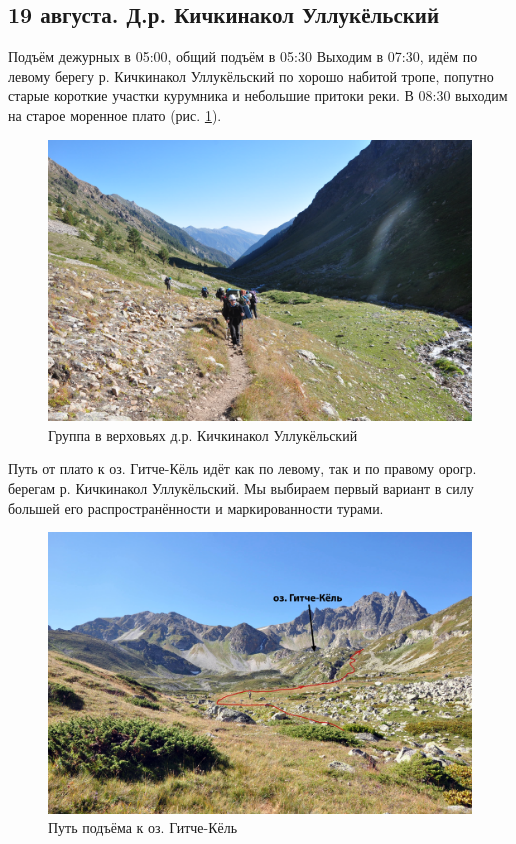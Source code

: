 \subsection{19 августа. Д.р. Кичкинакол Уллукёльский}

Подъём дежурных в 05:00, общий подъём в 05:30 
Выходим в 07:30, идём по левому берегу р. Кичкинакол Уллукёльский по хорошо набитой тропе, попутно  старые короткие участки курумника и небольшие притоки реки. В 08:30 выходим на старое моренное плато (рис. \ref{fig:DSC_0692}).

\begin{figure}[h!]
	\centering
	\includegraphics[width=0.7\linewidth]{../pics/DSC_0692}
	\caption{Группа в верховьях д.р. Кичкинакол Уллукёльский}
	\label{fig:DSC_0692}
\end{figure}

Путь от плато к оз. Гитче-Кёль идёт как по левому, так и по правому орогр. берегам р. Кичкинакол Уллукёльский. Мы выбираем первый вариант в силу большей его распространённости и маркированности турами. 

\begin{figure}[h!]
	\centering
	\includegraphics[width=0.7\linewidth]{../pics/DSC_0718}
	\caption{Путь подъёма к оз. Гитче-Кёль}
	\label{fig:DSC_0718}
\end{figure}

